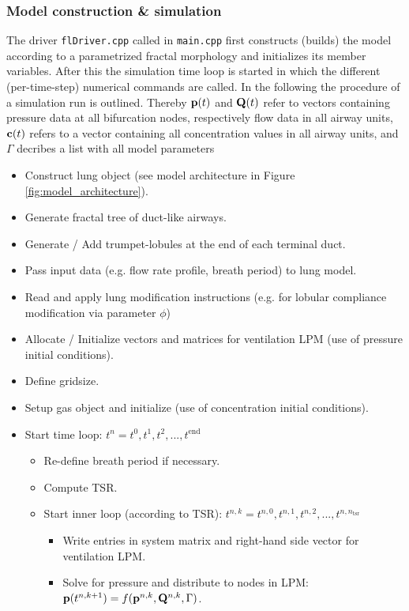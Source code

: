 \subsubsection{Model construction \& simulation}
The driver \texttt{flDriver.cpp} called in \texttt{main.cpp} first constructs (builds) the model according to a parametrized fractal morphology and initializes its member variables.
After this the simulation time loop is started in which the different (per-time-step) numerical commands are called.
In the following the procedure of a simulation run is outlined.
Thereby $\mathbf{p}(t)$ and $\mathbf{Q}(t)$ refer to vectors containing pressure data at all bifurcation nodes, respectively flow data in all airway units, $\mathbf{c}(t)$ refers to a vector containing all concentration values in all airway units, and $\Gamma$ decribes a list with all model parameters
\begin{itemize}
  \item Construct lung object (see model architecture in Figure \ref{fig:model_architecture}).
  \item Generate fractal tree of duct-like airways.
  \item Generate / Add trumpet-lobules at the end of each terminal duct.
  \item Pass input data (e.g. flow rate profile, breath period) to lung model.
  \item Read and apply lung modification instructions (e.g. for lobular compliance modification via parameter $\phi$)
  \item Allocate / Initialize vectors and matrices for ventilation LPM (use of pressure initial conditions).
  \item Define gridsize.
  \item Setup gas object and initialize (use of concentration initial conditions).
  \item Start time loop: $t^{n} = t^{0}, t^{1}, t^{2},...,t^\mathrm{end}$
  \begin{itemize}
    \item Re-define breath period if necessary.
    \item Compute TSR.
    \item Start inner loop (according to TSR): $t^{n,k} = t^{n,0}, t^{n,1}, t^{n,2},...,t^{n,n_\mathrm{tsr}}$
    \begin{itemize}
      \item Write entries in system matrix and right-hand side vector for ventilation LPM.
      \item Solve for pressure and distribute to nodes in LPM: $\mathbf{p}(t^{n, k+1}) = f(\mathbf{p}^{n, k}, \mathbf{Q}^{n, k}, \Gamma)$.

\end{itemize}
\end{itemize}
\end{itemize}
